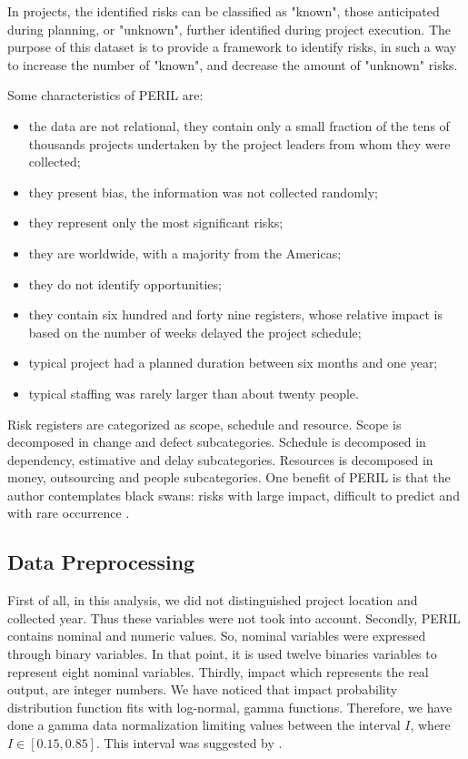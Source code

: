 \documentclass[a4paper,twoside]{article}
\begin{document}
In projects, the identified risks can be classified as "known", those anticipated during planning, or "unknown", further identified during project execution. The purpose of this dataset is to provide a framework to identify risks, in such a way to increase the number of "known", and decrease the amount of "unknown" risks.

Some characteristics of PERIL are: 
\begin{itemize}
\item the data are not relational, they contain only a small fraction of the tens of thousands projects undertaken by the project leaders from whom they were collected;
\item they present bias, the information was not collected randomly;
\item they represent only the most significant risks;
\item they are worldwide, with a majority from the Americas;
\item they do not identify opportunities; 
\item they contain six hundred and forty nine registers, whose relative impact is based on the number of weeks delayed the project schedule;
\item typical project had a planned duration between six months and one year;
\item typical staffing was rarely larger than about twenty people.
\end{itemize}

Risk registers are categorized as scope, schedule and resource. Scope is decomposed in change and defect subcategories. Schedule is decomposed in dependency, estimative and delay subcategories. Resources is decomposed in money, outsourcing and people subcategories. One benefit of PERIL is that the author contemplates black swans: risks with large impact, difficult to predict and with rare occurrence \cite{taleb2001fooled}. 

\subsection{Data Preprocessing}
\label{sec:datapreprocessing}

\noindent First of all, in this analysis, we did not distinguished project location and collected year. Thus these variables were not took into account. Secondly, PERIL contains nominal and numeric values. So, nominal variables were expressed through binary variables. In that point, it is used twelve binaries variables to represent eight nominal variables. Thirdly, impact which represents the real output, are integer numbers. We have noticed that impact probability distribution function fits with log-normal, gamma functions. Therefore, we have done a gamma data normalization \cite{han2006data} limiting values between the interval $I$, where $I  \in  [ 0.15 , 0.85 ]$. This interval was suggested by \cite{valenca2005aplicando}.
\end{document}
